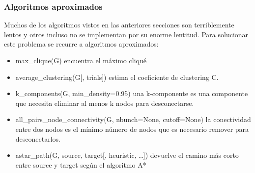 \subsubsection{Algoritmos aproximados}
Muchos de los algoritmos vistos en las anteriores secciones son terriblemente lentos y otros incluso no se implementan por su enorme lentitud. Para solucionar este problema se recurre a algoritmos aproximados:
\begin{itemize}
\item max\_clique(G) encuentra el máximo cliqué 
\item average\_clustering(G[, trials]) estima el coeficiente de clustering C.
\item k\_components(G, min\_density=0.95) una k-componente es una componente que necesita eliminar al menos k nodos para desconectarse.
\item all\_pairs\_node\_connectivity(G, nbunch=None, cutoff=None) la conectividad entre dos nodos es el mínimo número de nodos que es necesario remover para desconectarlos.
\item astar\_path(G, source, target[, heuristic, …]) devuelve el camino más corto entre source y target según el algoritmo A*
\end{itemize}
